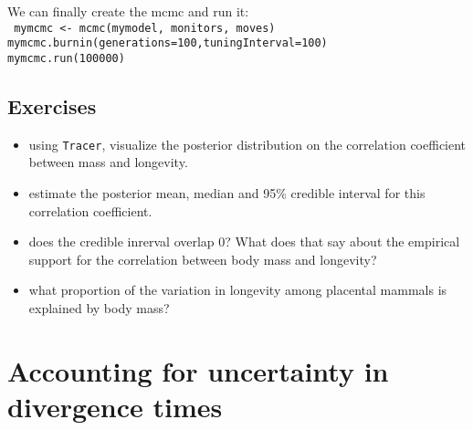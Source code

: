 \documentclass[usletter]{article}
\newcommand{\cmd}[1]{\texttt{#1}}
\begin{document}
We can finally create the mcmc and run it:
\\
\cmd{
mymcmc <- mcmc(mymodel, monitors, moves)
\\
mymcmc.burnin(generations=100,tuningInterval=100)
\\
mymcmc.run(100000)
}

\subsection*{Exercises}

\begin{itemize}
\item
using \cmd{Tracer}, visualize the posterior distribution on the correlation coefficient between mass and longevity.
\item
estimate the posterior mean, median and 95\% credible interval for this correlation coefficient.
\item
does the credible inrerval overlap 0? What does that say about the empirical support for the correlation between body mass and longevity?
\item
what proportion of the variation in longevity among placental mammals is explained by body mass?
\end{itemize}


\section{Accounting for uncertainty in divergence times}
\end{document}
